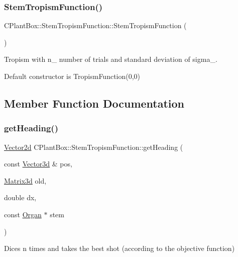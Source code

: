 \subsubsection{\texorpdfstring{Stem\+Tropism\+Function()}{StemTropismFunction()}\hspace{0.1cm}{\footnotesize\ttfamily [2/2]}}
{\footnotesize\ttfamily C\+Plant\+Box\+::\+Stem\+Tropism\+Function\+::\+Stem\+Tropism\+Function (\begin{DoxyParamCaption}{ }\end{DoxyParamCaption})\hspace{0.3cm}{\ttfamily [inline]}}



Tropism with n\+\_\+ number of trials and standard deviation of sigma\+\_\+. 

Default constructor is Tropism\+Function(0,0) 

\subsection{Member Function Documentation}
\mbox{\label{classCPlantBox_1_1StemTropismFunction_ac72f7ad1200d1defbb3c9b20e20d1f62}} 
\subsubsection{\texorpdfstring{get\+Heading()}{getHeading()}}
{\footnotesize\ttfamily \hyperlink{classCPlantBox_1_1Vector2d}{Vector2d} C\+Plant\+Box\+::\+Stem\+Tropism\+Function\+::get\+Heading (\begin{DoxyParamCaption}\item[{const \hyperlink{classCPlantBox_1_1Vector3d}{Vector3d} \&}]{pos,  }\item[{\hyperlink{classCPlantBox_1_1Matrix3d}{Matrix3d}}]{old,  }\item[{double}]{dx,  }\item[{const \hyperlink{classCPlantBox_1_1Organ}{Organ} $\ast$}]{stem }\end{DoxyParamCaption})\hspace{0.3cm}{\ttfamily [virtual]}}



Dices n times and takes the best shot (according to the objective function) 

